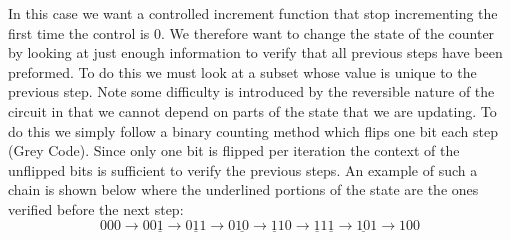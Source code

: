   In this case we want a controlled increment function that stop incrementing the first time the control is $0$.
  We therefore want to change the state of the counter by looking at just enough information to verify that all previous steps have been preformed.
  To do this we must look at a subset whose value is unique to the previous step.
  Note some difficulty is introduced by the reversible nature of the circuit in that we cannot depend on parts of the state that we are updating.
  To do this we simply follow a binary counting method which flips one bit each step (Grey Code).
  Since only one bit is flipped per iteration the context of the unflipped bits is sufficient to verify the previous steps.
  An example of such a chain is shown below where the underlined portions of the state are the ones verified before the next step:
  \[
    000 \to 00\underline{1} \to 0\underline{1}1 \to 0\underline{10} \to \underline{1}10 \to
    \underline{1}1\underline{1} \to \underline{10}1 \to 100
  \]
